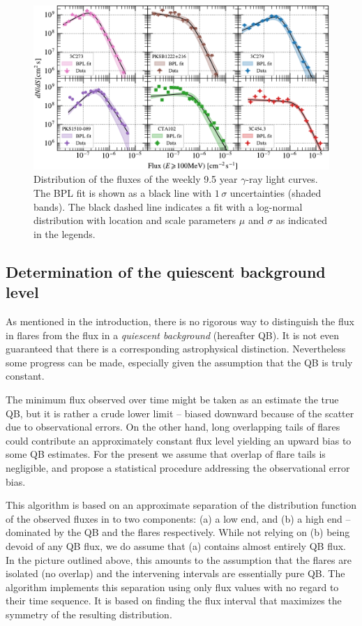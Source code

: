 \documentclass[twocolumn,linenumbers]{aastex62}
\newcommand{\gray}{$\gamma$-ray\xspace}
\begin{document}
\begin{figure}
    \includegraphics[width = .99\linewidth]{fluxdist_weekly_tsmin9.pdf}
    \caption{\label{fig:fluxpdf} Distribution of the fluxes of the weekly 9.5 year \gray light curves. The BPL fit is shown as a black line with $1\,\sigma$ uncertainties (shaded bands). The black dashed line indicates a fit with a log-normal distribution with location and scale parameters $\mu$ and $\sigma$ as indicated in the legends.}
\end{figure}

\subsection{Determination of the quiescent background level}
\label{sec:qb}
As mentioned in the introduction, 
there is no rigorous way to distinguish the 
flux in flares from the flux 
in a {\em quiescent background} (hereafter QB).
It is not even guaranteed that
there is a corresponding astrophysical distinction.
Nevertheless some progress can be made,
especially given the assumption that the QB is
truly constant.

The minimum flux observed over time 
might be taken as an estimate the true QB,
but it is rather a crude lower limit  -- biased downward 
because of the scatter due to observational errors.
On the other hand, long overlapping tails of flares 
could contribute an approximately constant flux level
yielding an upward bias to some QB estimates.
For the present we assume that overlap of flare tails
is negligible, and propose a statistical
procedure addressing the observational error bias.

This algorithm is based on an approximate 
separation of the distribution function of the observed
fluxes in to two components: 
(a) a low end, and (b) a high end -- dominated by
the QB and the flares respectively.
While not relying on (b) being devoid of any QB flux,
we do assume that (a) contains almost entirely QB flux.
In the picture outlined above, this amounts to the
assumption that the flares are isolated (no overlap) 
and the intervening intervals are essentially pure QB.
The algorithm implements this separation
using only flux values with no regard to 
their time sequence.  It is based on finding the
flux interval that maximizes the symmetry of 
the resulting distribution.
\end{document}
